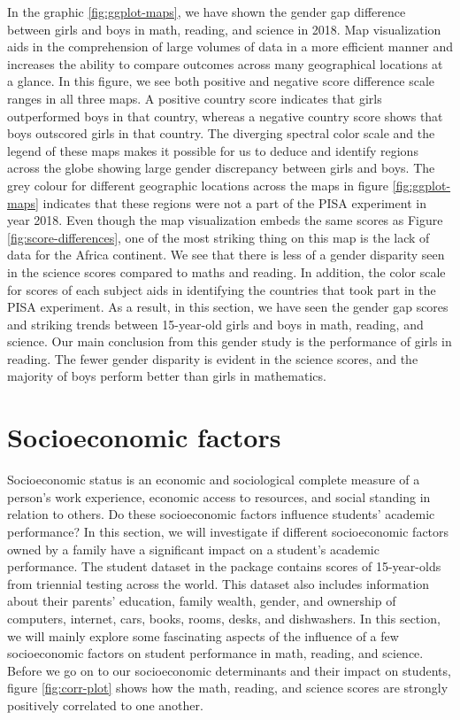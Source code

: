 In the graphic \ref{fig:ggplot-maps}, we have shown the gender gap difference between girls and boys in math, reading, and science in 2018. Map visualization aids in the comprehension of large volumes of data in a more efficient manner and increases the ability to compare outcomes across many geographical locations at a glance. In this figure, we see both positive and negative score difference scale ranges in all three maps. A positive country score indicates that girls outperformed boys in that country, whereas a negative country score shows that boys outscored girls in that country. The diverging spectral color scale and the legend of these maps makes it possible for us to deduce and identify regions across the globe showing large gender discrepancy between girls and boys. The grey colour for different geographic locations across the maps in figure \ref{fig:ggplot-maps} indicates that these regions were not a part of the PISA experiment in year 2018. Even though the map visualization embeds the same scores as Figure \ref{fig:score-differences}, one of the most striking thing on this map is the lack of data for the Africa continent. We see that there is less of a gender disparity seen in the science scores compared to maths and reading. In addition, the color scale for scores of each subject aids in identifying the countries that took part in the PISA experiment. As a result, in this section, we have seen the gender gap scores and striking trends between 15-year-old girls and boys in math, reading, and science. Our main conclusion from this gender study is the performance of girls in reading. The fewer gender disparity is evident in the science scores, and the majority of boys perform better than girls in mathematics.

\hypertarget{socioeconomic-factors}{%
\section{Socioeconomic factors}\label{socioeconomic-factors}}

Socioeconomic status is an economic and sociological complete measure of a person's work experience, economic access to resources, and social standing in relation to others. Do these socioeconomic factors influence students' academic performance? In this section, we will investigate if different socioeconomic factors owned by a family have a significant impact on a student's academic performance. The student dataset in the  package contains scores of 15-year-olds from triennial testing across the world. This dataset also includes information about their parents' education, family wealth, gender, and ownership of computers, internet, cars, books, rooms, desks, and dishwashers. In this section, we will mainly explore some fascinating aspects of the influence of a few socioeconomic factors on student performance in math, reading, and science. Before we go on to our socioeconomic determinants and their impact on students, figure \ref{fig:corr-plot} shows how the math, reading, and science scores are strongly positively correlated to one another.

